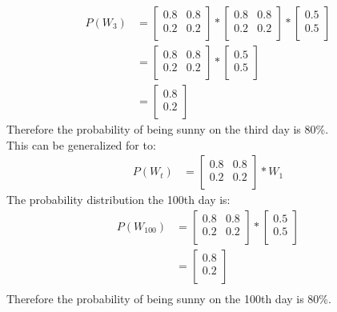 \documentclass[12pt]{article}
\begin{document}
\begin{align*}
    P(W_3) & = \begin{bmatrix}
        0.8 & 0.8 \\
        0.2 & 0.2 \\
    \end{bmatrix}
    *
    \begin{bmatrix}
        0.8 & 0.8 \\
        0.2 & 0.2 \\
    \end{bmatrix}
    *
    \begin{bmatrix}
        0.5 \\
        0.5 \\
    \end{bmatrix}            \\
           & = \begin{bmatrix}
        0.8 & 0.8 \\
        0.2 & 0.2 \\
    \end{bmatrix}
    *
    \begin{bmatrix}
        0.5 \\
        0.5 \\
    \end{bmatrix}            \\
           & = \begin{bmatrix}
        0.8 \\
        0.2 \\
    \end{bmatrix}
\end{align*}
Therefore the probability of being sunny on the third day is 80\%.\\
This can be generalized for to:
\begin{align*}
    P(W_t) & = \begin{bmatrix}
        0.8 & 0.8 \\
        0.2 & 0.2 \\
    \end{bmatrix}
    *
    W_1
\end{align*}
The probability distribution the 100th day is:
\begin{align*}
    P(W_{100}) & = \begin{bmatrix}
        0.8 & 0.8 \\
        0.2 & 0.2 \\
    \end{bmatrix}
    *
    \begin{bmatrix}
        0.5 \\
        0.5 \\
    \end{bmatrix}                \\
               & =
    \begin{bmatrix}
        0.8 \\
        0.2 \\
    \end{bmatrix}                \\
\end{align*}
Therefore the probability of being sunny on the 100th day is 80\%.
\end{document}
